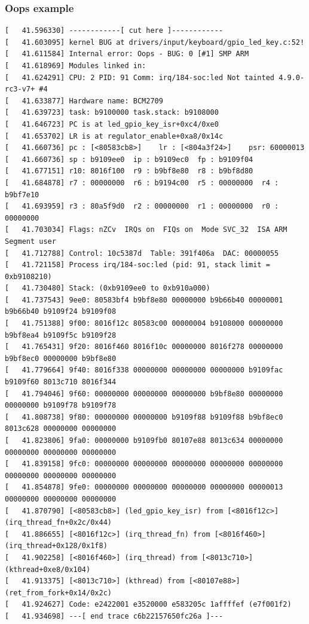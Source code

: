 \documentclass{beamer}
\begin{document}
\begin{frame}[fragile]
\frametitle{Oops example}
\tiny
\begin{verbatim}
[   41.596330] ------------[ cut here ]------------
[   41.603095] kernel BUG at drivers/input/keyboard/gpio_led_key.c:52!
[   41.611584] Internal error: Oops - BUG: 0 [#1] SMP ARM
[   41.618969] Modules linked in:
[   41.624291] CPU: 2 PID: 91 Comm: irq/184-soc:led Not tainted 4.9.0-rc3-v7+ #4
[   41.633877] Hardware name: BCM2709
[   41.639723] task: b9100000 task.stack: b9108000
[   41.646723] PC is at led_gpio_key_isr+0xc4/0xe0
[   41.653702] LR is at regulator_enable+0xa8/0x14c
[   41.660736] pc : [<80583cb8>]    lr : [<804a3f24>]    psr: 60000013
[   41.660736] sp : b9109ee0  ip : b9109ec0  fp : b9109f04
[   41.677151] r10: 8016f100  r9 : b9bf8e80  r8 : b9bf8d80
[   41.684878] r7 : 00000000  r6 : b9194c00  r5 : 00000000  r4 : b9bf7e10
[   41.693959] r3 : 80a5f9d0  r2 : 00000000  r1 : 00000000  r0 : 00000000
[   41.703034] Flags: nZCv  IRQs on  FIQs on  Mode SVC_32  ISA ARM  Segment user
[   41.712788] Control: 10c5387d  Table: 391f406a  DAC: 00000055
[   41.721158] Process irq/184-soc:led (pid: 91, stack limit = 0xb9108210)
[   41.730480] Stack: (0xb9109ee0 to 0xb910a000)
[   41.737543] 9ee0: 80583bf4 b9bf8e80 00000000 b9b66b40 00000001 b9b66b40 b9109f24 b9109f08
[   41.751388] 9f00: 8016f12c 80583c00 00000004 b9108000 00000000 b9bf8ea4 b9109f5c b9109f28
[   41.765431] 9f20: 8016f460 8016f10c 00000000 8016f278 00000000 b9bf8ec0 00000000 b9bf8e80
[   41.779664] 9f40: 8016f338 00000000 00000000 00000000 b9109fac b9109f60 8013c710 8016f344
[   41.794046] 9f60: 00000000 00000000 00000000 b9bf8e80 00000000 00000000 b9109f78 b9109f78
[   41.808738] 9f80: 00000000 00000000 b9109f88 b9109f88 b9bf8ec0 8013c628 00000000 00000000
[   41.823806] 9fa0: 00000000 b9109fb0 80107e88 8013c634 00000000 00000000 00000000 00000000
[   41.839158] 9fc0: 00000000 00000000 00000000 00000000 00000000 00000000 00000000 00000000
[   41.854878] 9fe0: 00000000 00000000 00000000 00000000 00000013 00000000 00000000 00000000
[   41.870790] [<80583cb8>] (led_gpio_key_isr) from [<8016f12c>] (irq_thread_fn+0x2c/0x44)
[   41.886655] [<8016f12c>] (irq_thread_fn) from [<8016f460>] (irq_thread+0x128/0x1f8)
[   41.902258] [<8016f460>] (irq_thread) from [<8013c710>] (kthread+0xe8/0x104)
[   41.913375] [<8013c710>] (kthread) from [<80107e88>] (ret_from_fork+0x14/0x2c)
[   41.924627] Code: e2422001 e3520000 e583205c 1affffef (e7f001f2) 
[   41.934698] ---[ end trace c6b22157650fc26a ]---
\end{verbatim}
\end{frame}
\end{document}
